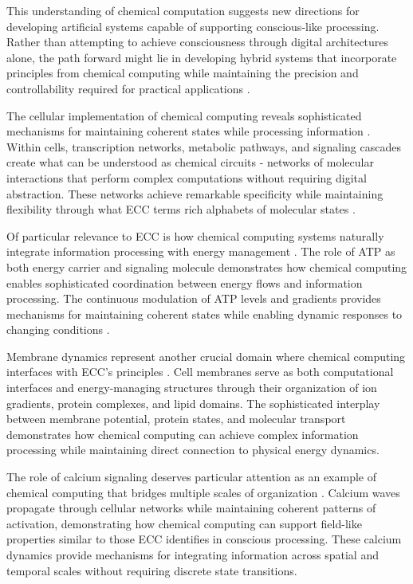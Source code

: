 \begin{refsection}
This understanding of chemical computation suggests new directions for developing artificial systems capable of supporting conscious-like processing. Rather than attempting to achieve consciousness through digital architectures alone, the path forward might lie in developing hybrid systems that incorporate principles from chemical computing while maintaining the precision and controllability required for practical applications \cite{Szacilowski2012, Wang2021}.

The cellular implementation of chemical computing reveals sophisticated mechanisms for maintaining coherent states while processing information \cite{Dittrich2018}. Within cells, transcription networks, metabolic pathways, and signaling cascades create what can be understood as chemical circuits - networks of molecular interactions that perform complex computations without requiring digital abstraction. These networks achieve remarkable specificity while maintaining flexibility through what ECC terms rich alphabets of molecular states \cite{Benenson2019}.

Of particular relevance to ECC is how chemical computing systems naturally integrate information processing with energy management \cite{Katz2012}. The role of ATP as both energy carrier and signaling molecule demonstrates how chemical computing enables sophisticated coordination between energy flows and information processing. The continuous modulation of ATP levels and gradients provides mechanisms for maintaining coherent states while enabling dynamic responses to changing conditions \cite{Lehn2013}.

Membrane dynamics represent another crucial domain where chemical computing interfaces with ECC's principles \cite{Magnasco1997}. Cell membranes serve as both computational interfaces and energy-managing structures through their organization of ion gradients, protein complexes, and lipid domains. The sophisticated interplay between membrane potential, protein states, and molecular transport demonstrates how chemical computing can achieve complex information processing while maintaining direct connection to physical energy dynamics.

The role of calcium signaling deserves particular attention as an example of chemical computing that bridges multiple scales of organization \cite{Prakash2007}. Calcium waves propagate through cellular networks while maintaining coherent patterns of activation, demonstrating how chemical computing can support field-like properties similar to those ECC identifies in conscious processing. These calcium dynamics provide mechanisms for integrating information across spatial and temporal scales without requiring discrete state transitions.


\end{refsection}
